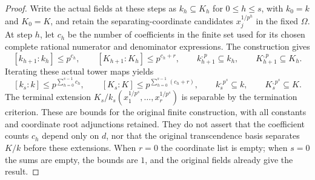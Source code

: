\begin{proof}
Write the actual fields at these steps as
$k_h\subseteq K_h$ for $0\leq h\leq s$,
with $k_0=k$ and $K_0=K$, and retain the
separating-coordinate candidates
$x_j^{1/p^h}$ in the fixed $\Omega$.
At step $h$, let $c_h$ be the number of
coefficients in the finite set used for its
chosen complete rational numerator and
denominator expressions. The construction gives
$$
[k_{h+1}:k_h]\leq p^{c_h},\qquad
[K_{h+1}:K_h]\leq p^{c_h+r},\qquad
k_{h+1}^{,p}\subseteq k_h,\qquad
K_{h+1}^{,p}\subseteq K_h.
$$
Iterating these actual tower maps yields
$$
[k_s:k]\leq p^{\sum_{h=0}^{s-1}c_h},\qquad
[K_s:K]\leq p^{\sum_{h=0}^{s-1}(c_h+r)},\qquad
k_s^{,p^s}\subseteq k,\qquad K_s^{,p^s}\subseteq K.
$$
The terminal extension
$K_s/k_s(x_1^{1/p^s},\ldots,x_r^{1/p^s})$
is separable by the termination criterion.
These are bounds for the original finite
construction, with all constants and coordinate
root adjunctions retained. They do not assert
that the coefficient counts $c_h$ depend only
on $d$, nor that the original transcendence
basis separates $K/k$ before these extensions.
When $r=0$ the coordinate list is empty; when
$s=0$ the sums are empty, the bounds are $1$,
and the original fields already give the result.
\end{proof}